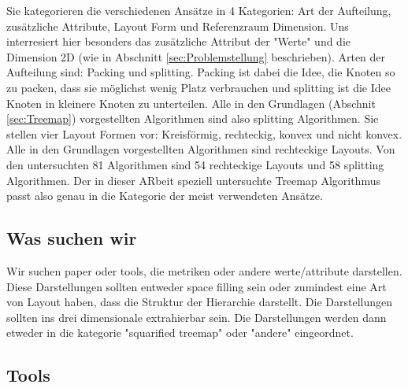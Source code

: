 Sie kategorieren die verschiedenen Ansätze in 4 Kategorien: Art der Aufteilung, zusätzliche Attribute, Layout Form und Referenzraum Dimension. 
Uns interresiert hier besonders das zusätzliche Attribut der "Werte" und die Dimension 2D (wie in Abschnitt \ref{sec:Problemstellung} beschrieben).
Arten der Aufteilung sind: Packing und splitting. Packing ist dabei die Idee, die Knoten so zu packen, dass sie möglichst wenig Platz verbrauchen und splitting ist die Idee Knoten in kleinere Knoten zu unterteilen. Alle in den Grundlagen (Abschnit \ref{sec:Treemap}) vorgestellten Algorithmen sind also splitting Algorithmen.
Sie stellen vier Layout Formen vor: Kreisförmig, rechteckig, konvex und nicht konvex. Alle in den Grundlagen vorgestellten Algorithmen sind rechteckige Layouts.
Von den untersuchten 81 Algorithmen sind 54 rechteckige Layouts und 58 splitting Algorithmen. Der in dieser ARbeit speziell untersuchte Treemap Algorithmus passt also genau in die Kategorie der meist verwendeten Ansätze.

\smallskip

\subsection{Was suchen wir} 
Wir suchen paper oder tools, die metriken oder andere werte/attribute darstellen.
Diese Darstellungen sollten entweder space filling sein oder zumindest eine Art von Layout haben, dass die Struktur der Hierarchie darstellt.
Die Darstellungen sollten ins drei dimensionale extrahierbar sein. 
Die Darstellungen werden dann etweder in die kategorie "squarified treemap" oder "andere" eingeordnet.



\subsection{Tools}
